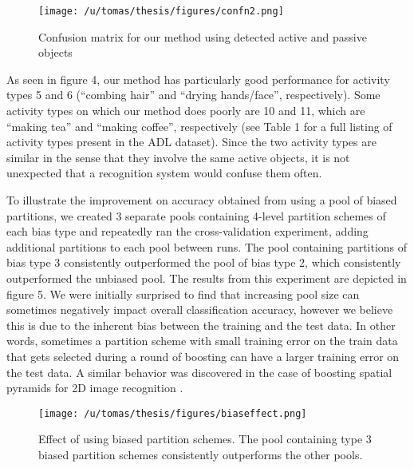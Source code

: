 \documentclass{bmvc2k}
\begin{document}
  \begin{figure}[t]
		\begin{center}
			  \texttt{[image: /u/tomas/thesis/figures/confn2.png]}
		\end{center}
		   \caption{Confusion matrix for our method using detected active and
       passive objects}
				\label{fig:long}
				\label{fig:onecol}
	\end{figure}
	As seen in figure 4, our method has particularly good
  performance for activity types 5 and 6 (``combing hair'' and ``drying
  hands/face'', respectively). Some activity types on which our method does
  poorly are 10 and 11, which are ``making tea'' and ``making coffee'',
  respectively (see Table 1 for a full listing of activity types present in
  the ADL dataset). Since the two activity types are similar in the sense that
  they involve the same active objects, it is not
  unexpected that a recognition system would confuse them often.
  
  To illustrate the improvement on accuracy obtained from using a pool of
  biased partitions, we created 3 separate pools containing 4-level
  partition schemes of each bias type and
  repeatedly ran the cross-validation experiment, adding additional
  partitions to each pool between runs. The pool containing partitions of
  bias type 3 consistently outperformed the pool of bias type 2, which
  consistently outperformed the unbiased pool. The
  results from this experiment are depicted in figure 5. We were initially
  surprised to find that increasing pool size can
  sometimes negatively impact overall classification accuracy, however we
  believe this is due to the inherent bias between the training and the test
  data. In other words, sometimes a partition scheme with small training error
  on the train data that gets selected during a round of boosting can have a
  larger training error on the test data. A similar behavior was discovered
  in the case of boosting spatial pyramids for 2D image recognition
  \cite{Jiang12}.
 
  \begin{figure}[t]
		\begin{center}
			  \texttt{[image: /u/tomas/thesis/figures/biaseffect.png]}
		\end{center}
		   \caption{Effect of using biased partition schemes. The pool
       containing type 3 biased partition schemes consistently outperforms
     the other pools.}
				\label{fig:long}
				\label{fig:onecol}
	\end{figure}
  
\end{document}
